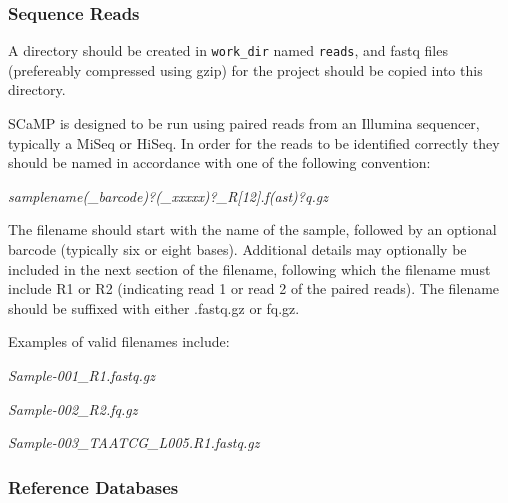 \documentclass[a4paper,10pt]{article}
\newenvironment{tight_itemize}{
\begin{itemize}
  \setlength{\itemsep}{0pt}
  \setlength{\parskip}{0pt}
}{\end{itemize}}
\begin{document}
\subsubsection{Sequence Reads}

A directory should be created in {\tt work\_dir} named {\tt reads}, and fastq
files (prefereably compressed using gzip) for the project should be copied into
this directory.

SCaMP is designed to be run using paired reads from an Illumina sequencer,
typically a MiSeq or HiSeq. In order for the reads to be identified correctly
they should be named in accordance with one of the following convention:

\textit{samplename(\_barcode)?(\_xxxxx)?\_R[12].f(ast)?q.gz}

The filename should start with the name of the sample, followed by an optional
barcode (typically six or eight bases). Additional details may optionally be
included in the next section of the filename, following which the filename must
include R1 or R2 (indicating read 1 or read 2 of the paired reads). The
filename should be suffixed with either .fastq.gz or fq.gz.

Examples of valid filenames include:
\begin{tight_itemize}
\item \textit{Sample-001\_R1.fastq.gz}
\item \textit{Sample-002\_R2.fq.gz}
\item \textit{Sample-003\_TAATCG\_L005.R1.fastq.gz}
\end{tight_itemize}

\subsubsection{Reference Databases}
\end{document}

